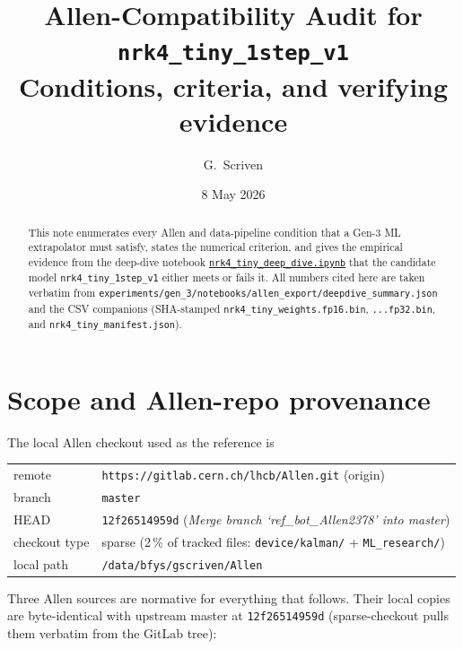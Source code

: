 \documentclass[11pt,a4paper]{article}
\title{Allen-Compatibility Audit for \texttt{nrk4\_tiny\_1step\_v1}\\
       \large Conditions, criteria, and verifying evidence}
\author{G.\ Scriven}
\date{8 May 2026}
\begin{document}
\maketitle

\begin{abstract}
This note enumerates every Allen and data-pipeline condition that a Gen-3
ML extrapolator must satisfy, states the numerical criterion, and gives
the empirical evidence from the deep-dive notebook
\href{run:../../experiments/gen_3/notebooks/nrk4_tiny_deep_dive.ipynb}{\texttt{nrk4\_tiny\_deep\_dive.ipynb}}
that the candidate model \texttt{nrk4\_tiny\_1step\_v1} either meets or
fails it. All numbers cited here are taken verbatim from
\texttt{experiments/gen\_3/notebooks/allen\_export/deepdive\_summary.json}
and the CSV companions (SHA-stamped \texttt{nrk4\_tiny\_weights.fp16.bin},
\texttt{...fp32.bin}, and \texttt{nrk4\_tiny\_manifest.json}).
\end{abstract}

\section{Scope and Allen-repo provenance}

The local Allen checkout used as the reference is

\begin{center}
\begin{tabular}{ll}
\toprule
remote   & \texttt{https://gitlab.cern.ch/lhcb/Allen.git} (origin) \\
branch   & \texttt{master} \\
HEAD     & \texttt{12f26514959d} (\textit{Merge branch `ref\_bot\_Allen2378' into master}) \\
checkout type & sparse (2\,\% of tracked files: \texttt{device/kalman/} +
                \texttt{ML\_research/}) \\
local path & \texttt{/data/bfys/gscriven/Allen} \\
\bottomrule
\end{tabular}
\end{center}

Three Allen sources are normative for everything that follows. Their
local copies are byte-identical with upstream master at
\texttt{12f26514959d} (sparse-checkout pulls them verbatim from the
GitLab tree):
\end{document}
